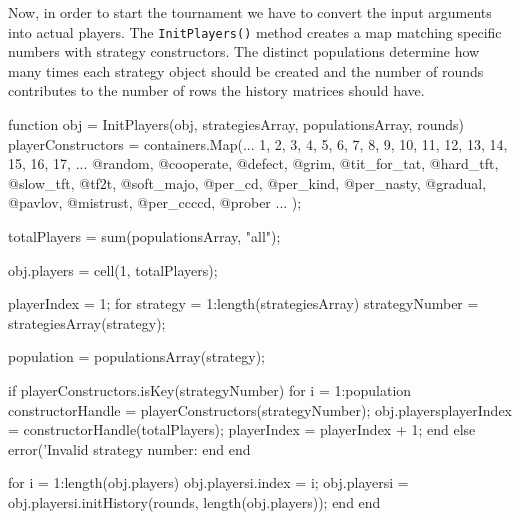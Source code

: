 Now, in order to start the tournament we have to convert the input arguments into actual players. The \texttt{InitPlayers()} method creates a map matching specific numbers with strategy constructors. The distinct populations determine how many times each strategy object should be created and the number of rounds contributes to the number of rows the history matrices should have. 
\begin{}
function obj = InitPlayers(obj, strategiesArray, populationsArray, rounds)
    playerConstructors = containers.Map(...
        {1, 2, 3, 4, 5, 6, 7, 8, 9, 10, 11, 12, 13, 14, 15, 16, 17}, ... %
        {@random, @cooperate, @defect, @grim, @tit_for_tat, @hard_tft, @slow_tft, @tf2t, @soft_majo, @per_cd, @per_kind, @per_nasty, @gradual, @pavlov, @mistrust, @per_ccccd, @prober} ... %
    );

    totalPlayers = sum(populationsArray, "all");

    obj.players = cell(1, totalPlayers);

    playerIndex = 1; %
    for strategy = 1:length(strategiesArray)
        strategyNumber = strategiesArray(strategy);
        
        population = populationsArray(strategy);
        
        if playerConstructors.isKey(strategyNumber)
            for i = 1:population
                constructorHandle = playerConstructors(strategyNumber); %
                obj.players{playerIndex} = constructorHandle(totalPlayers); %
                playerIndex = playerIndex + 1; %
            end
        else
            error('Invalid strategy number: %
        end
    end

    for i = 1:length(obj.players)
        obj.players{i}.index = i;
        obj.players{i} = obj.players{i}.initHistory(rounds, length(obj.players));
    end
end
\end{}

